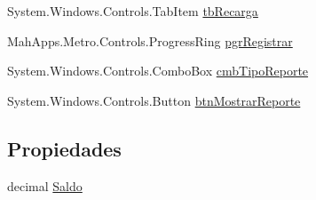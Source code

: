 \begin{DoxyCompactItemize}
System.\-Windows.\-Controls.\-Tab\-Item \hyperlink{class_proyecto___integrador__3_1_1_main_window_af0f488983962bf0457a4b9d02c1df2a6}{tb\-Recarga}
\item 
Mah\-Apps.\-Metro.\-Controls.\-Progress\-Ring \hyperlink{class_proyecto___integrador__3_1_1_main_window_a3013e3941492422c2fb9151f99f5d3ef}{pgr\-Registrar}
\item 
System.\-Windows.\-Controls.\-Combo\-Box \hyperlink{class_proyecto___integrador__3_1_1_main_window_af005273fce43d170b199a3f487ab24cf}{cmb\-Tipo\-Reporte}
\item 
System.\-Windows.\-Controls.\-Button \hyperlink{class_proyecto___integrador__3_1_1_main_window_a25cb685eade86d0879fa3c6f991487c5}{btn\-Mostrar\-Reporte}
\end{DoxyCompactItemize}
\subsection*{Propiedades}
\begin{DoxyCompactItemize}
\item 
decimal \hyperlink{class_proyecto___integrador__3_1_1_main_window_ad93b9e5447037b83ac9f811025390509}{Saldo}
\end{DoxyCompactItemize}
